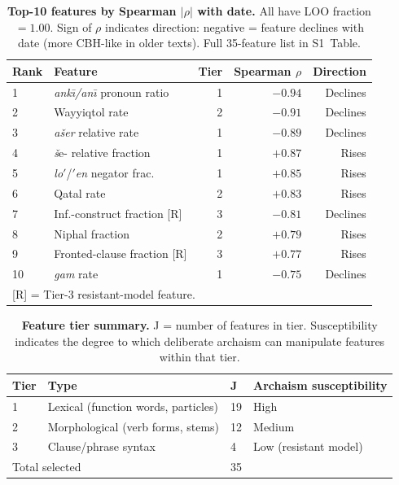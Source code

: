\documentclass[10pt,letterpaper]{article}
\begin{document}
\begin{table}[!ht]
\centering
\caption{\textbf{Top-10 features by Spearman $|\rho|$ with date.}
All have LOO fraction $= 1.00$.  Sign of $\rho$ indicates direction:
negative = feature declines with date (more CBH-like in older texts).
Full 35-feature list in S1~Table.}
\begin{tabular}{llrrr}
\hline
\textbf{Rank} & \textbf{Feature} & \textbf{Tier} &
  \textbf{Spearman $\rho$} & \textbf{Direction} \\
\hline
1  & \textit{ank\={\i}/an\={\i}} pronoun ratio & 1 & $-0.94$ & Declines \\
2  & Wayyiqtol rate                            & 2 & $-0.91$ & Declines \\
3  & \textit{ašer} relative rate               & 1 & $-0.89$ & Declines \\
4  & \textit{š}e- relative fraction            & 1 & $+0.87$ & Rises    \\
5  & \textit{lo$'$}/\textit{$'$en} negator frac.& 1 & $+0.85$ & Rises    \\
6  & Qatal rate                                & 2 & $+0.83$ & Rises    \\
7  & Inf.-construct fraction [R]               & 3 & $-0.81$ & Declines \\
8  & Niphal fraction                           & 2 & $+0.79$ & Rises    \\
9  & Fronted-clause fraction [R]               & 3 & $+0.77$ & Rises    \\
10 & \textit{gam} rate                         & 1 & $-0.75$ & Declines \\
\hline
\multicolumn{5}{l}{\small{[R] = Tier-3 resistant-model feature.}} \\
\end{tabular}
\label{tab:top_features}
\end{table}

\begin{table}[!ht]
\centering
\caption{\textbf{Feature tier summary.}  J = number of features in tier.
Susceptibility indicates the degree to which deliberate archaism can
manipulate features within that tier.}
\begin{tabular}{llll}
\hline
\textbf{Tier} & \textbf{Type} & \textbf{J} & \textbf{Archaism susceptibility} \\
\hline
1 & Lexical (function words, particles) & 19 & High \\
2 & Morphological (verb forms, stems)   & 12 & Medium \\
3 & Clause/phrase syntax                &  4 & Low (resistant model) \\
\hline
\multicolumn{2}{l}{Total selected} & 35 & \\
\hline
\end{tabular}
\label{tab:features}
\end{table}
\end{document}
